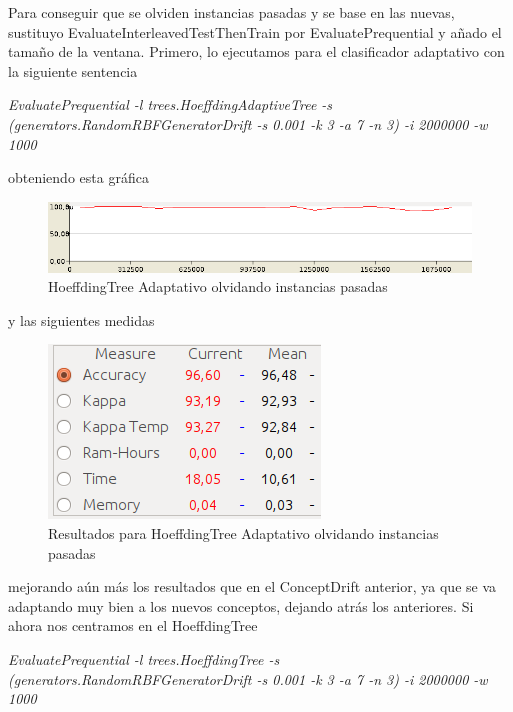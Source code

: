 Para conseguir que se olviden instancias pasadas y se base en las nuevas, sustituyo EvaluateInterleavedTestThenTrain por EvaluatePrequential y añado el tamaño de la ventana. Primero, lo ejecutamos para el clasificador adaptativo con la siguiente sentencia

\textit{EvaluatePrequential -l trees.HoeffdingAdaptiveTree -s (generators.RandomRBFGeneratorDrift -s 0.001 -k 3 -a 7 -n 3) -i 2000000 -w 1000}

obteniendo esta gráfica

\begin{figure}[H] %
	\centering
	\includegraphics[scale=0.4]{graph4.png}  %
	\caption{HoeffdingTree Adaptativo olvidando instancias pasadas} 
	\label{fig:graph4}
\end{figure}

y las siguientes medidas 

\begin{figure}[H] %
	\centering
	\includegraphics[scale=0.5]{measures41.png}  %
	\caption{Resultados para HoeffdingTree Adaptativo olvidando instancias pasadas} 
	\label{fig:measure41}
\end{figure}

mejorando aún más los resultados que en el ConceptDrift anterior, ya que se va adaptando muy bien a los nuevos conceptos, dejando atrás los anteriores. Si ahora nos centramos en el HoeffdingTree

\textit{EvaluatePrequential -l trees.HoeffdingTree -s (generators.RandomRBFGeneratorDrift -s 0.001 -k 3 -a 7 -n 3) -i 2000000 -w 1000}

